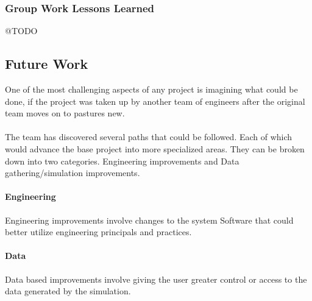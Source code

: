 \documentclass[11pt]{article}
\begin{document}
\subsubsection{Group Work Lessons Learned}
@TODO

\pagebreak
\subsection{Future Work} 
One of the most challenging aspects of any project is imagining what could be done, if the project was taken up by another team of engineers after the original team moves on to pastures new.
\\~\\
The team has discovered several paths that could be followed. Each of which would advance the base project into more specialized areas.
They can be broken down into two categories. Engineering improvements and Data gathering/simulation improvements.

\paragraph{Engineering}
Engineering improvements involve changes to the system Software that could better utilize engineering principals and practices.

\paragraph{Data}
Data based improvements involve giving the user greater control or access to the data generated by the simulation.\\
\end{document}
